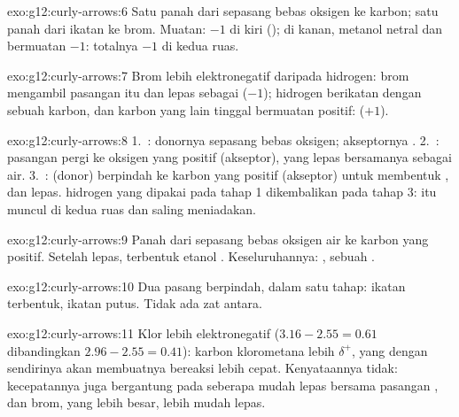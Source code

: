\begin{solution}{exo:g12:curly-arrows:6}
Satu panah dari sepasang  bebas oksigen  ke karbon; satu
panah dari ikatan  ke brom. Muatan: $-1$ di kiri (); di
kanan, metanol netral dan  bermuatan $-1$: totalnya $-1$ di
kedua ruas.
\end{solution}

\begin{solution}{exo:g12:curly-arrows:7}
Brom lebih elektronegatif daripada hidrogen: brom mengambil pasangan itu
dan lepas sebagai  ($-1$); hidrogen berikatan dengan sebuah
karbon, dan karbon yang lain tinggal bermuatan positif: 
($+1$).
\end{solution}

\begin{solution}{exo:g12:curly-arrows:8}
1.~: donornya sepasang 
bebas oksigen; akseptornya . 2.~:
pasangan  pergi ke oksigen yang positif (akseptor), yang lepas
bersamanya sebagai air. 3.~:   (donor) berpindah ke karbon yang positif
(akseptor) untuk membentuk , dan  lepas. 
hidrogen yang dipakai pada tahap 1 dikembalikan pada tahap 3:  itu
muncul di kedua ruas dan saling meniadakan.
\end{solution}

\begin{solution}{exo:g12:curly-arrows:9}
Panah dari sepasang  bebas oksigen air ke karbon yang positif.
Setelah  lepas, terbentuk etanol . Keseluruhannya:
, sebuah .
\end{solution}

\begin{solution}{exo:g12:curly-arrows:10}
Dua pasang  berpindah, dalam satu tahap: ikatan 
terbentuk, ikatan  putus. Tidak ada zat antara.
\end{solution}

\begin{solution}{exo:g12:curly-arrows:11}
Klor lebih elektronegatif ($3.16 - 2.55 = 0.61$ dibandingkan
$2.96 - 2.55 = 0.41$): karbon klorometana lebih $\delta^+$, yang dengan
sendirinya akan membuatnya bereaksi lebih cepat. Kenyataannya tidak:
kecepatannya juga bergantung pada seberapa mudah  lepas
bersama pasangan , dan brom, yang lebih besar, lebih mudah
lepas.
\end{solution}

